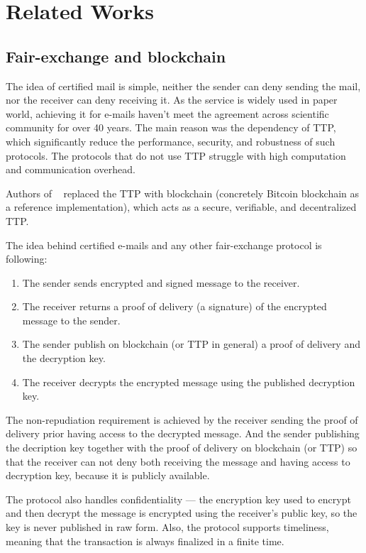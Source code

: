 \documentclass{ieeeaccess}
\begin{document}
\section{Related Works}\label{sec:related-works}

\subsection{Fair-exchange and blockchain}
The idea of certified mail is simple, neither the sender can deny sending the mail, nor the receiver can deny receiving it. As the service is widely used in paper world, achieving it for e-mails haven't meet the agreement across scientific community for over 40 years. The main reason was the dependency of TTP, which significantly reduce the performance, security, and robustness of such protocols. The protocols that do not use TTP struggle with high computation and communication overhead.

Authors of ~\cite{hinarejos2019solution} replaced the TTP with blockchain (concretely Bitcoin blockchain as a reference implementation), which acts as a secure, verifiable, and decentralized TTP.

The idea behind certified e-mails and any other fair-exchange protocol is following:
\begin{enumerate}
    \item The sender sends encrypted and signed message to the receiver.
    \item The receiver returns a proof of delivery (a signature) of the encrypted message to the sender.
    \item The sender publish on blockchain (or TTP in general) a proof of delivery and the decryption key.
    \item The receiver decrypts the encrypted message using the published decryption key.
\end{enumerate}

The non-repudiation requirement is achieved by the receiver sending the proof of delivery prior having access to the decrypted message. And the sender publishing the decription key together with the proof of delivery on blockchain (or TTP) so that the receiver can not deny both receiving the message and having access to decryption key, because it is publicly available.

The protocol also handles confidentiality — the encryption key used to encrypt and then decrypt the message is encrypted using the receiver's public key, so the key is never published in raw form.
Also, the protocol supports timeliness, meaning that the transaction is always finalized in a finite time.
\end{document}
